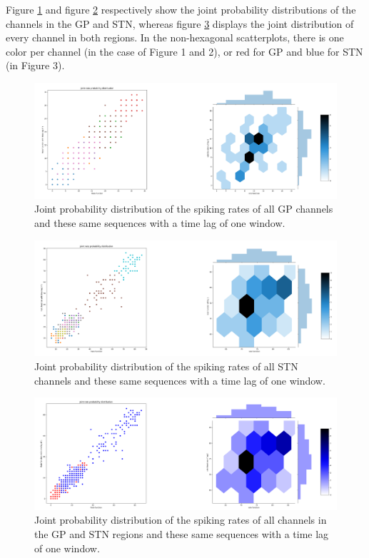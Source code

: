 \documentclass{article}
\begin{document}
Figure \ref{fig:JP1} and figure \ref{fig:JP2} respectively show the joint probability distributions of the channels in the GP and STN, whereas figure \ref{fig:JP3} displays the joint distribution of every channel in both regions. 
In the non-hexagonal scatterplots, there is one color per channel (in the case of Figure 1 and 2), or red for GP and blue for STN (in Figure 3).

\begin{figure}[H]
    \centering
    \centerline{\includegraphics[width=1\textwidth]{images/spiking/JP_gp.png}}
    \caption{Joint probability distribution of the spiking rates of all GP channels and these same sequences with a time lag of one window. }
    \label{fig:JP1}
\end{figure}

\begin{figure}[H]
    \centering
    \centerline{\includegraphics[width=1\textwidth]{images/spiking/JP_stn.png}}
    \caption{Joint probability distribution of the spiking rates of all STN channels and these same sequences with a time lag of one window.}
    \label{fig:JP2}
\end{figure}

\begin{figure}[H]
    \centering
    \centerline{\includegraphics[width=1\textwidth]{images/spiking/JP_all.png}}
    \caption{Joint probability distribution of the spiking rates of all channels in the GP and STN regions and these same sequences with a time lag of one window.}
    \label{fig:JP3}
\end{figure}
\end{document}

